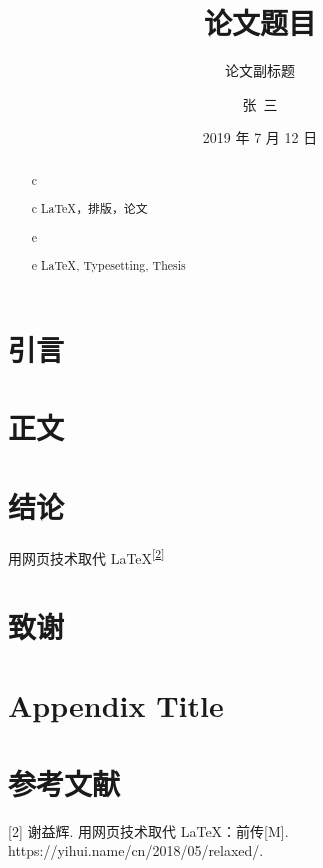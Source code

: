 \documentclass{thesis}
\title{论文题目}
\subtitle{论文副标题}
\author{张\ 三}
\date{2019 年 7 月 12 日}
\begin{document}
\frontmatter
\maketitle

\begin{abstract}{c}
\zhlipsum[1]

\begin{keywords}{c}
\LaTeX{}，排版，论文
\end{keywords}
\end{abstract}

\begin{abstract}{e}
\lipsum[1]
\begin{keywords}{e}
\LaTeX{}, Typesetting, Thesis
\end{keywords}
\end{abstract}
 
\tableofcontents

\mainmatter

\chapter{引言}
\zhlipsum[1-2]

\chapter{正文}
\zhlipsum[1-15]

\chapter{结论}
用网页技术取代 \LaTeX{}\textsuperscript{{[}\hyperlink{ref-weborlatex}{2}{]}}

\backmatter

\chapter*{致谢}
\zhlipsum[1]

\appendix
\chapter{Appendix Title}
\zhlipsum[1]

\chapter*{参考文献}
\leavevmode\hypertarget{ref-weborlatex}{}%
{[}2{]} 谢益辉. 用网页技术取代 LaTeX：前传{[}M{]}.
https://yihui.name/cn/2018/05/relaxed/.
\end{document}

